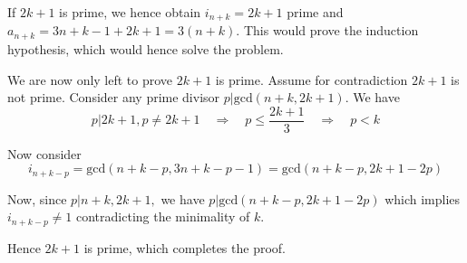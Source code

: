 \documentclass[a4paper, 12pt]{article}
\begin{document}
\begin{enumerate}
    If $2k+1$ is prime, we hence obtain $i_{n+k}=2k+1$ prime and $a_{n+k}=3n+k-1+2k+1=3(n+k)$. This would prove the induction hypothesis, which would hence solve the problem.
    
    We are now only left to prove $2k+1$ is prime. Assume for contradiction $2k+1$ is not prime. Consider any prime divisor $p|\textrm{gcd}(n+k, 2k+1)$. We have
     $$ p|2k+1, p\neq 2k+1 \quad \Longrightarrow \quad p \leq \frac{2k+1}{3} \quad \Longrightarrow \quad p<k $$
     
     Now consider
     $$ i_{n+k-p}=\textrm{gcd}(n+k-p, 3n+k-p-1)=\textrm{gcd}(n+k-p, 2k+1-2p) $$
     
     Now, since $p|n+k, 2k+1,$ we have $p|\textrm{gcd}(n+k-p, 2k+1-2p)$ which implies $ i_{n+k-p} \neq 1$ contradicting the minimality of $k$.
     
     Hence $2k+1$ is prime, which completes the proof.
    
    
\end{enumerate}


\centering
\begin{BVerbatim}
\end{BVerbatim}
\end{document}
